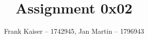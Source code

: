 \documentclass{article}
\begin{document}
\title{Assignment 0x02}
\author{Frank Kaiser -- 1742945, Jan Martin -- 1796943}

\maketitle

\tableofcontents



\end{document}
